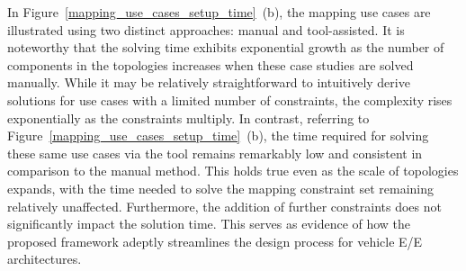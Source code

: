     In Figure~\ref{mapping_use_cases_setup_time}~(b), the mapping use cases are illustrated using two distinct approaches: manual and tool-assisted. It is noteworthy that the solving time exhibits exponential growth as the number of components in the topologies increases when these case studies are solved manually. While it may be relatively straightforward to intuitively derive solutions for use cases with a limited number of constraints, the complexity rises exponentially as the constraints multiply.
    In contrast, referring to Figure~\ref{mapping_use_cases_setup_time}~(b), the time required for solving these same use cases via the tool remains remarkably low and consistent in comparison to the manual method. This holds true even as the scale of topologies expands, with the time needed to solve the mapping constraint set remaining relatively unaffected. Furthermore, the addition of further constraints does not significantly impact the solution time. This serves as evidence of how the proposed framework adeptly streamlines the design process for vehicle E/E architectures.




    
    
